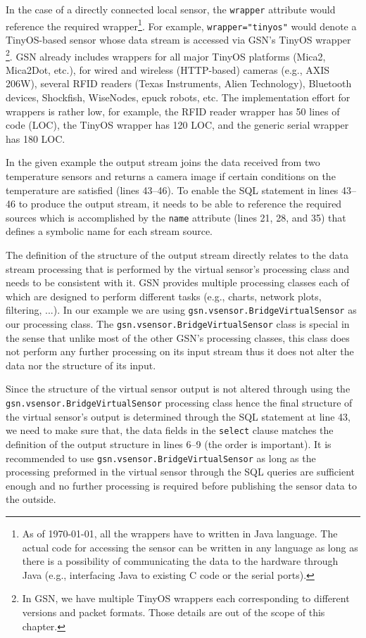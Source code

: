In the case of a directly connected local sensor, the \verb|wrapper| attribute would reference the required wrapper\footnote{As of \today, all the wrappers have to written in Java language. The actual code for accessing the sensor can be written in any language as long as there is a possibility of communicating the data to the hardware
through Java (e.g., interfacing Java to existing C code or the serial ports).}.
For example, \verb|wrapper="tinyos"| would denote a TinyOS-based sensor whose data
stream is accessed via GSN's TinyOS wrapper \footnote{In GSN, we have multiple TinyOS wrappers each corresponding to different
versions and packet formats. Those details are out of the scope of this chapter.}.
GSN already includes wrappers for all major TinyOS platforms (Mica2, Mica2Dot, etc.), for wired and wireless
(HTTP-based) cameras (e.g., AXIS 206W), several RFID readers (Texas
Instruments, Alien Technology), Bluetooth devices, Shockfish, WiseNodes, epuck
robots, etc. The implementation effort for wrappers is rather low, for example,
the RFID reader wrapper has 50 lines of code (LOC), the TinyOS wrapper has 120
LOC, and the generic serial wrapper has 180 LOC.

In the given example the output stream joins the data received from two
temperature sensors and returns a camera image if certain conditions on the
temperature are satisfied (lines 43--46). To enable the SQL statement in lines
43--46 to produce the output stream, it needs to be able to reference the
required sources which is accomplished by the \verb|name| attribute
(lines 21, 28, and 35) that defines a symbolic name for each stream source.

The definition of the structure of the output stream directly relates to the data
stream processing that is performed by the virtual sensor's processing class and needs to be
consistent with it. GSN provides multiple processing classes each of which are designed
to perform different tasks (e.g., charts, network plots, filtering, ...). In our example we are using
\texttt{gsn.vsensor.BridgeVirtualSensor} as our processing class. The \texttt{gsn.vsensor.BridgeVirtualSensor}
class is special in the sense that unlike most of the other GSN's processing classes, this class does not
perform any further processing on its input stream thus it does not alter the data nor the structure of its input.

Since the structure of the virtual sensor output is not altered through using the \texttt{gsn.vsensor.BridgeVirtualSensor} processing class hence the final
structure of the virtual sensor's output is determined through the SQL statement at line 43, we need to make sure that,
the data fields in the \verb|select| clause matches the definition of the output structure in lines 6--9 (the order is important).
It is recommended to use \texttt{gsn.vsensor.BridgeVirtualSensor} as long as the processing preformed in the virtual
sensor through the SQL queries are sufficient enough and no further processing is required before publishing the sensor 
data to the outside.

